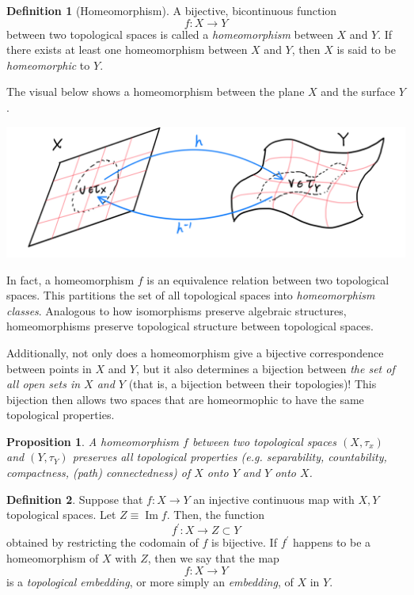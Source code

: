 \documentclass{article}
\DeclareMathOperator{\im}{Im}
\newtheorem{proposition}[theorem]{Proposition}
\theoremstyle{remark}
\theoremstyle{definition}
\newtheorem{definition}{Definition}[section]
\begin{document}
\begin{definition}[Homeomorphism]
A bijective, bicontinuous function 
\[f: X \longrightarrow Y\]
between two topological spaces is called a \textit{homeomorphism} between $X$ and $Y$. If there exists at least one homeomorphism between $X$ and $Y$, then $X$ is said to be \textit{homeomorphic} to $Y$. 

The visual below shows a homeomorphism between the plane $X$ and the surface $Y$. 
\begin{center}
    \includegraphics[scale=0.25]{img/Homeomorphism_of_Plane.PNG}
\end{center}
\end{definition}

In fact, a homeomorphism $f$ is an equivalence relation between two topological spaces. This partitions the set of all topological spaces into \textit{homeomorphism classes}. Analogous to how isomorphisms preserve algebraic structures, homeomorphisms preserve topological structure between topological spaces. 

Additionally, not only does a homeomorphism give a bijective correspondence between points in $X$ and $Y$, but it also determines a bijection between \textit{the set of all open sets in $X$ and $Y$} (that is, a bijection between their topologies)! This bijection then allows two spaces that are homeormophic to have the same topological properties. 

\begin{proposition}
A homeomorphism $f$ between two topological spaces $(X, \tau_{x})$ and $(Y, \tau_{Y})$ preserves all topological properties (e.g. separability, countability, compactness, (path) connectedness) of $X$ onto $Y$ and $Y$ onto $X$. 
\end{proposition}

\begin{definition}
Suppose that $f: X \longrightarrow Y$ an injective continuous map with $X, Y$ topological spaces. Let $Z \equiv \im{f}$. Then, the function
\[f^\prime: X \longrightarrow Z \subset Y\]
obtained by restricting the codomain of $f$ is bijective. If $f^\prime$ happens to be a homeomorphism of $X$ with $Z$, then we say that the map
\[f: X \longrightarrow Y\]
is a \textit{topological embedding}, or more simply an \textit{embedding}, of $X$ in $Y$. 
\end{definition}
\end{document}

